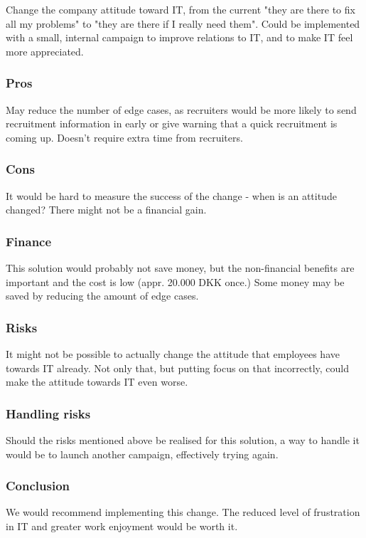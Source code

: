 Change the company attitude toward IT, from the current "they are there to fix all my problems" to "they are there if I really need them".
Could be implemented with a small, internal campaign to improve relations to IT, and to make IT feel more appreciated.

\subsubsection{Pros} May reduce the number of edge cases, as recruiters would be more likely to send recruitment information in early or give warning that a quick recruitment is coming up.
Doesn't require extra time from recruiters.

\subsubsection{Cons} It would be hard to measure the success of the change - when is an attitude changed?
There might not be a financial gain.

\subsubsection{Finance} 
This solution would probably not save money, but the non-financial benefits are important and the cost is low (appr. 20.000 DKK once.)
Some money may be saved by reducing the amount of edge cases.

\subsubsection{Risks}
It might not be possible to actually change the attitude that employees have towards IT already. Not only that, but putting focus on that incorrectly, could make the attitude towards IT even worse.

\subsubsection{Handling risks}
Should the risks mentioned above be realised for this solution, a way to handle it would be to launch another campaign, effectively trying again. 

\subsubsection{Conclusion} 
We would recommend implementing this change. 
The reduced level of frustration in IT and greater work enjoyment would be worth it.